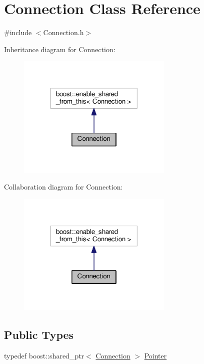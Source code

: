 \hypertarget{class_connection}{}\section{Connection Class Reference}
\label{class_connection}


{\ttfamily \#include $<$Connection.\+h$>$}



Inheritance diagram for Connection\+:\nopagebreak
\begin{figure}[H]
\begin{center}
\leavevmode
\includegraphics[width=210pt]{class_connection__inherit__graph}
\end{center}
\end{figure}


Collaboration diagram for Connection\+:\nopagebreak
\begin{figure}[H]
\begin{center}
\leavevmode
\includegraphics[width=210pt]{class_connection__coll__graph}
\end{center}
\end{figure}
\subsection*{Public Types}
\begin{DoxyCompactItemize}
\item 
typedef boost\+::shared\+\_\+ptr$<$ \hyperlink{class_connection}{Connection} $>$ \hyperlink{class_connection_afc73789251390ec9c9c6e3750b104f08}{Pointer}
\end{DoxyCompactItemize}
